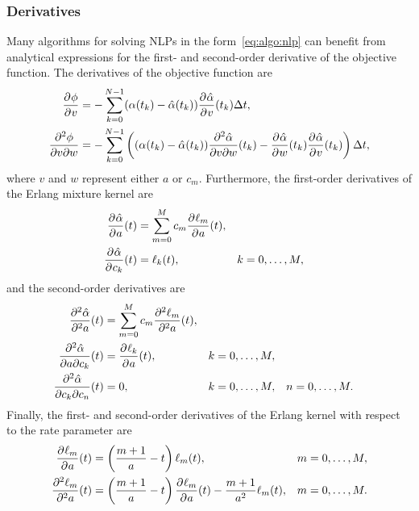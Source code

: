 \subsubsection{Derivatives}
Many algorithms for solving NLPs in the form~\eqref{eq:algo:nlp} can benefit from analytical expressions for the first- and second-order derivative of the objective function. The derivatives of the objective function are
%
\begin{subequations}
	\begin{align}
		\pdiff{\phi}{v} &= -\sum_{k=0}^{N-1} (\alpha(t_k) - \hat \alpha(t_k)) \pdiff{\hat \alpha}{v}(t_k) \Delta t, \\
		\mdiff{\phi}{v}{w} &= -\sum_{k=0}^{N-1} \left((\alpha(t_k) - \hat \alpha(t_k)) \mdiff{\hat \alpha}{v}{w}(t_k) - \pdiff{\hat \alpha}{w}(t_k) \pdiff{\hat \alpha}{v}(t_k)\right) \Delta t,
	\end{align}
\end{subequations}
%
where $v$ and $w$ represent either $a$ or $c_m$. Furthermore, the first-order derivatives of the Erlang mixture kernel are
%
\begin{subequations}
	\begin{align}
		\pdiff{\hat \alpha}{a}(t)     	&= \sum_{m=0}^{M} c_m \pdiff{\ell_m}{a}(t), \\
		\pdiff{\hat \alpha}{c_k}(t) 	&= \ell_k(t), & k &= 0, \ldots, M,
	\end{align}
\end{subequations}
%
and the second-order derivatives are
%
\begin{subequations}
	\begin{align}
		\pdiff[2]{\hat \alpha}{a}(t)        &= \sum_{m=0}^{M} c_m \pdiff[2]{\ell_m}{a}(t), \\
		\mdiff{\hat \alpha}{a}{c_k}(t) 		&= \pdiff{\ell_k}{a}(t), & k &= 0, \ldots, M, \\
		\mdiff{\hat \alpha}{c_k}{c_n}(t) 	&= 0, & k &= 0, \ldots, M, & n &= 0, \ldots, M.
	\end{align}
\end{subequations}
%
Finally, the first- and second-order derivatives of the Erlang kernel with respect to the rate parameter are
%
\begin{subequations}
	\begin{align}
		\pdiff{\ell_m}{a}(t) 		&= \left(\frac{m+1}{a} - t\right) \ell_m(t), & m &= 0, \ldots, M, \\
		\pdiff[2]{\ell_m}{a}(t) 	&= \left(\frac{m+1}{a} - t\right) \pdiff{\ell_m}{a}(t) - \frac{m+1}{a^2} \ell_m(t), & m &= 0, \ldots, M.
	\end{align}
\end{subequations}


